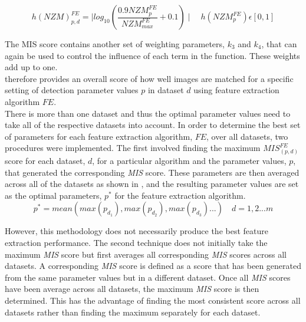 \documentclass{article}
\begin{document}
\begin{equation}
h(\textit{NZM})_{p, d}^{FE} = \mid log_{10}(\frac{0.9\textit{NZM}_{p}^{FE}}{\textit{NZM}_{max}^{FE}} + 0.1) \mid \quad h(\textit{NZM}_{p}^{FE})\epsilon [0, 1]
\label{eqn:nzm}
\end{equation}

The MIS score contains another set of weighting parameters, $k_3$ and $k_4$, that can again be used to control the influence of each term in the function. These weights add up to one.\\

 therefore provides an overall score of how well images are matched for a specific setting of detection parameter values $p$ in dataset $d$ using feature extraction algorithm $FE$. \\

There is more than one dataset and thus the optimal parameter values need to take all of the respective datasets into account. In order to determine the best set of parameters for each feature extraction algorithm, $FE$, over all datasets, two procedures were implemented. The first involved finding the maximum $\textit{MIS}_{(p, d)}^{FE}$ score for each dataset, $d$, for a particular algorithm and the parameter values, $p$, that generated the corresponding \textit{MIS} score. These parameters are then averaged across all of the datasets as shown in , and the resulting parameter values are set as the optimal parameters, $p^*$ for the feature extraction algorithm.\\

\begin{equation}
p^* = mean( max(p_{d_1}), max(p_{d_2}), max(p_{d_3}) ...) \quad d = 1,2...m
\label{eqn:average}
\end{equation}

However, this methodology does not necessarily produce the best feature extraction performance. The second technique does not initially take the maximum \textit{MIS} score but first averages all corresponding \textit{MIS} scores across all datasets. A corresponding \textit{MIS} score is defined as a score that has been generated from the same parameter values but in a different dataset. Once all \textit{MIS} scores have been average across all datasets, the maximum \textit{MIS} score is then determined. This has the advantage of finding the most consistent score across all datasets rather than finding the maximum separately for each dataset.\\
\end{document}
